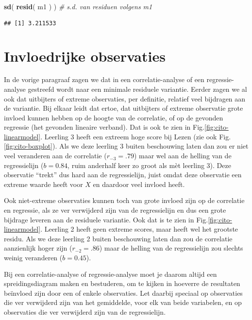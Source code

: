 \documentclass[
]{book}
\newenvironment{Shaded}{\begin{snugshade}}{\end{snugshade}}
\newcommand{\CommentTok}[1]{\textcolor[rgb]{0.56,0.35,0.01}{\textit{#1}}}
\newcommand{\KeywordTok}[1]{\textcolor[rgb]{0.13,0.29,0.53}{\textbf{#1}}}
\newcommand{\NormalTok}[1]{#1}
\begin{document}
\begin{Shaded}
\begin{Highlighting}[]
\KeywordTok{sd}\NormalTok{( }\KeywordTok{resid}\NormalTok{( m1 ) ) }\CommentTok{\# s.d. van residuen volgens \textasciigrave{}m1\textasciigrave{}}
\end{Highlighting}
\end{Shaded}

\begin{verbatim}
## [1] 3.211533
\end{verbatim}

\hypertarget{invloedrijke-observaties}{%
\section{Invloedrijke observaties}\label{invloedrijke-observaties}}

In de vorige paragraaf zagen we dat in een correlatie-analyse of een
regressie-analyse gestreefd wordt naar een minimale residuele variantie.
Eerder zagen we al ook dat uitbijters of extreme observaties, per
definitie, relatief veel bijdragen aan de variantie. Bij elkaar leidt
dat ertoe, dat uitbijters of extreme observatie grote invloed kunnen
hebben op de hoogte van de correlatie, of op de gevonden regressie (het
gevonden lineaire verband). Dat is ook te zien in
Fig.\ref{fig:cito-linearmodel}. Leerling 3 heeft een extreem hoge
score bij Lezen (zie ook
Fig.\ref{fig:cito-boxplot}). Als we deze leerling 3 buiten
beschouwing laten dan zou er niet veel veranderen aan de correlatie
(\(r_{-3}=.79\)) maar wel aan de helling van de regressielijn (\(b=0.84\),
ruim anderhalf keer zo groot als mèt leerling 3). Deze observatie
``trekt'' dus hard aan de regressielijn, juist omdat deze observatie een
extreme waarde heeft voor \(X\) en daardoor veel invloed heeft.

Ook niet-extreme observaties kunnen toch van grote invloed zijn op de
correlatie en regressie, als ze ver verwijderd zijn van de regressielijn
en dus een grote bijdrage leveren aan de residuele variantie. Ook dat is
te zien in Fig.\ref{fig:cito-linearmodel}.
Leerling 2 heeft geen extreme scores,
maar heeft wel het grootste residu. Als we deze leerling 2 buiten
beschouwing laten dan zou de correlatie aanzienlijk hoger zijn
(\(r_{-2}=.86\)) maar de helling van de regressielijn zou slechts weinig
veranderen (\(b=0.45\)).

Bij een correlatie-analyse of regressie-analyse moet je daarom altijd
een spreidingsdiagram maken en bestuderen, om te kijken in hoeverre de
resultaten beïnvloed zijn door een of enkele observaties. Let daarbij
speciaal op observaties die ver verwijderd zijn van het gemiddelde, voor
elk van beide variabelen, en op observaties die ver verwijderd zijn van
de regressielijn.
\end{document}
